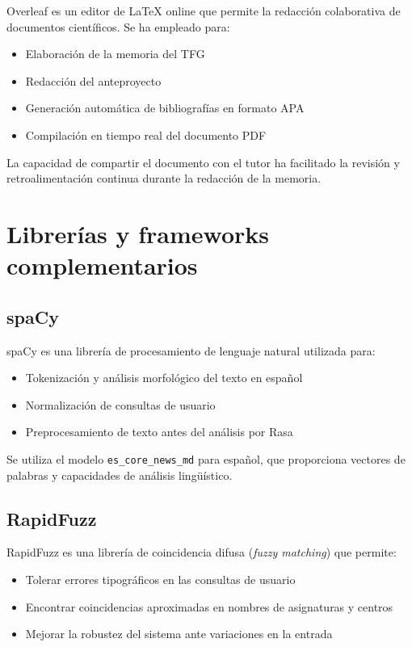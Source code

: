 Overleaf es un editor de LaTeX online que permite la redacción colaborativa de documentos científicos. Se ha empleado para:

\begin{itemize}
    \item Elaboración de la memoria del TFG
    \item Redacción del anteproyecto
    \item Generación automática de bibliografías en formato APA
    \item Compilación en tiempo real del documento PDF
\end{itemize}

La capacidad de compartir el documento con el tutor ha facilitado la revisión y retroalimentación continua durante la redacción de la memoria.

\section{Librerías y frameworks complementarios}\label{sec:librerias}

\subsection{spaCy}

spaCy es una librería de procesamiento de lenguaje natural utilizada para:

\begin{itemize}
    \item Tokenización y análisis morfológico del texto en español
    \item Normalización de consultas de usuario
    \item Preprocesamiento de texto antes del análisis por Rasa
\end{itemize}

Se utiliza el modelo \texttt{es\_core\_news\_md} para español, que proporciona vectores de palabras y capacidades de análisis lingüístico.

\subsection{RapidFuzz}

RapidFuzz es una librería de coincidencia difusa (\textit{fuzzy matching}) que permite:

\begin{itemize}
    \item Tolerar errores tipográficos en las consultas de usuario
    \item Encontrar coincidencias aproximadas en nombres de asignaturas y centros
    \item Mejorar la robustez del sistema ante variaciones en la entrada
\end{itemize}

